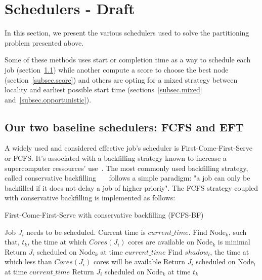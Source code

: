 \documentclass[conference,10pt]{IEEEtran}
\newcommand{\Node}[1]{\ensuremath{\mathrm{Node}_{#1}}\xspace}
\newcommand{\core}{\mathit{Cores}\xspace}
\newcommand{\walltime}{\mathit{Walltime}\xspace}
\newcommand{\nodeset}{\ensuremath{\mathbb{N}}\xspace}
\begin{document}

\section{Schedulers - Draft}\label{sec.schedulers}

In this section, we present the various schedulers used to solve
the partitioning problem presented above. 

Some of these methods uses start or completion time as a way to
schedule each job (section~\ref{subsec.fcfs_eft}) while another compute 
a score to choose the best node (section~\ref{subsec.score}) and others
are opting for a mixed strategy between locality and earliest possible start time
(sections~\ref{subsec.mixed} and~\ref{subsec.opportunistic}).

\subsection{Our two baseline schedulers: FCFS and EFT}\label{subsec.fcfs_eft}

A widely used and considered effective job's scheduler is 
First-Come-First-Serve or FCFS.
It's associated with a backfilling strategy known to increase
a supercomputer ressources' use~\cite{maui}. 
The most commonly used backfilling strategy, called conservative 
backfilling~\cite{Characterization_of_Backfilling}~\cite{slurm_website_scheduling}~\cite{Introducing-New-Backfill-based} follows
a simple paradigm: "a job can only be backfilled if it does not
delay a job of higher prioriy".
The FCFS strategy coupled with conservative backfilling is implemented as follows:
\begin{algorithm}[htbp]
	\caption{First-Come-First-Serve with conservative backfilling (FCFS-BF)}\label{algo.fcfsbf}
	\begin{algorithmic}[1]
		\State Job $J_i$ needs to be scheduled. Current time is $current\_time$.
		\State Find $\Node{k}$, such that, $t_k$, the time at which $\core(J_i)$ cores are available on $\Node{k}$ is minimal
			\State Return $J_i$ scheduled on $\Node{k}$ at time $current\_time$
		\Else
			\ForEach{$\Node{l} \in \nodeset$}
				\State Find $shadow_l$, the time at which less than $\core(J_i)$ cores will be available
				\If{$current\_time + \walltime(J_i) \leq shadow_l$}
					\State Return $J_i$ scheduled on $\Node{l}$ at time $current\_time$
				\EndIf
			\EndFor
			\State Return $J_i$ scheduled on $\Node{k}$ at time $t_k$
		\EndIf
	\end{algorithmic}
\end{algorithm}
\end{document}
